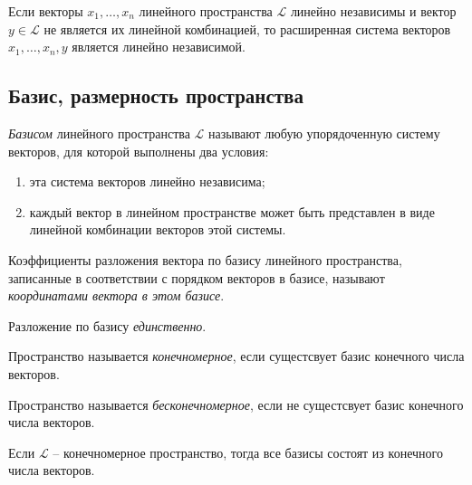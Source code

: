 \begin{property}
    Если векторы $x_1, \ldots, x_n$ линейного пространства $\mathcal{L}$ линейно независимы и вектор $y \in \mathcal{L}$ не является их линейной комбинацией, то расширенная система векторов $x_1, \ldots , x_n, y$ является линейно независимой.
\end{property}

\subsection{Базис, размерность пространства}

\begin{definition}[Базис]
    \textit{Базисом} линейного пространства $\mathcal{L}$ называют любую упорядоченную систему векторов, для которой выполнены два условия:
    \begin{enumerate}
        \item эта система векторов линейно независима;
        \item каждый вектор в линейном пространстве может быть представлен в виде линейной комбинации векторов этой системы.
    \end{enumerate}
\end{definition}

\begin{definition}
    Коэффициенты разложения вектора по базису линейного пространства, записанные в соответствии с порядком векторов в базисе, называют \textit{координатами вектора в этом базисе}.
\end{definition}

\begin{theorem}
    Разложение по базису \textit{единственно}.
\end{theorem}

\begin{definition}
    Пространство называется \textit{конечномерное}, если сущестсвует базис конечного числа векторов.
\end{definition}

\begin{definition}
    Пространство называется \textit{бесконечномерное}, если не сущестсвует базис конечного числа векторов.
\end{definition}

\begin{theorem}
    Если $\mathcal{L}$ -- конечномерное пространство, тогда все базисы состоят из конечного числа векторов.
\end{theorem}


